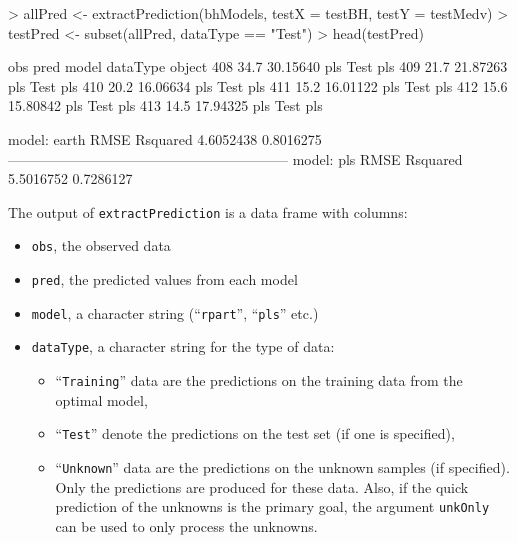 \documentclass[12pt]{article}
\begin{document}
\begin{small}
\begin{Schunk}
\begin{Sinput}
> allPred <- extractPrediction(bhModels, testX = testBH, testY = testMedv)
> testPred <- subset(allPred, dataType == "Test")
> head(testPred)
\end{Sinput}
\begin{Soutput}
     obs     pred model dataType object
408 34.7 30.15640   pls     Test    pls
409 21.7 21.87263   pls     Test    pls
410 20.2 16.06634   pls     Test    pls
411 15.2 16.01122   pls     Test    pls
412 15.6 15.80842   pls     Test    pls
413 14.5 17.94325   pls     Test    pls
\end{Soutput}
\begin{Soutput}
model: earth
     RMSE  Rsquared 
4.6052438 0.8016275 
------------------------------------------------------------ 
model: pls
     RMSE  Rsquared 
5.5016752 0.7286127 
\end{Soutput}
\end{Schunk}
\end{small}
The output of \texttt{extractPrediction} is a data frame with columns:
   \begin{itemize}   
      \item \texttt{obs}, the observed data
      \item \texttt{pred}, the predicted values from each model
      \item \texttt{model}, a character string (``\texttt{rpart}'', ``\texttt{pls}'' etc.)
      \item \texttt{dataType}, a character string for the type of data:
      \begin{itemize}
         \item ``\texttt{Training}'' data are the predictions on the training data from
            the optimal model,
         \item ``\texttt{Test}'' denote the predictions on the test set (if one is specified),
         \item ``\texttt{Unknown}'' data are the predictions on the unknown samples (if specified). 
         Only the predictions are produced for these data. Also, if the quick prediction of the unknowns
         is the primary goal, the argument \texttt{unkOnly} can be used to only process the unknowns.
      \end{itemize}
   \end{itemize}      
\end{document}
